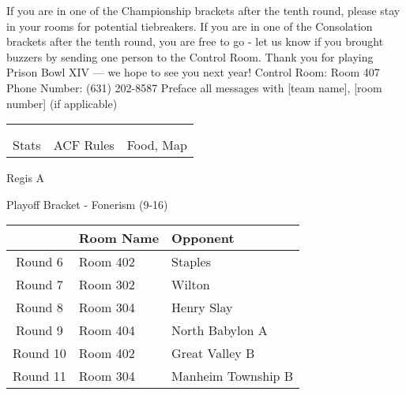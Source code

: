 \documentclass{article}%
\begin{document}
\vspace*{30pt}%
\linebreak%
If you are in one of the Championship brackets after the tenth round, please stay in your rooms for potential tiebreakers.\newline%
\newline%
If you are in one of the Consolation brackets after the tenth round, you are free to go {-} let us know if you brought buzzers by sending one person to the Control Room.\newline%
\newline%
Thank you for playing Prison Bowl XIV — we hope to see you next year!\newline%
\newline%
Control Room: Room 407\newline%
Phone Number: (631) 202{-}8587\newline%
Preface all messages with {[}team name{]}, {[}room number{]} (if applicable)%
\vspace*{30pt}%
\newline%
%
\begin{tabularx}{\textwidth}{YYY}%
  &  &  \\%
\\%
Stats&ACF Rules&Food, Map\\%
\end{tabularx}%
\newpage%
\begin{center}%
\begin{Huge}%
Regis A%
\end{Huge}%
\vspace*{12pt}%
\linebreak%
\begin{Large}%
Playoff Bracket {-} Fonerism (9{-}16)%
\end{Large}%
\end{center}%
\vspace*{4pt}%
%
\begin{tabularx}{\textwidth}{|c|Y|Y|}%
\hline%
&Room Name&Opponent\\%
\hline%
Round 6&Room 402&Staples\\%
Round 7&Room 302&Wilton\\%
Round 8&Room 304&Henry Slay\\%
Round 9&Room 404&North Babylon A\\%
Round 10&Room 402&Great Valley B\\%
Round 11&Room 304&Manheim Township B\\%
\hline%
\end{tabularx}%
\end{document}
